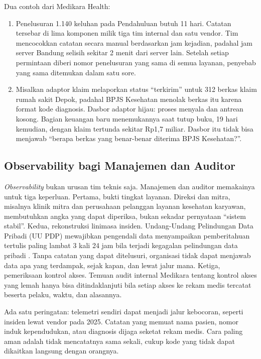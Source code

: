 Dua contoh dari Medikara Health:
\begin{enumerate}
  \item Penelusuran 1.140 keluhan pada Pendahuluan butuh 11 hari. Catatan tersebar di lima
        komponen milik tiga tim internal dan satu vendor. Tim mencocokkan catatan secara manual
        berdasarkan jam kejadian, padahal jam server Bandung selisih sekitar 2 menit dari server
        lain. Setelah setiap permintaan diberi nomor penelusuran yang sama di semua layanan,
        penyebab yang sama ditemukan dalam satu sore.
  \item Misalkan adaptor klaim melaporkan status ``terkirim'' untuk 312 berkas klaim rumah sakit
        Depok, padahal BPJS Kesehatan menolak berkas itu karena format kode diagnosis. Dasbor
        adaptor hijau: proses menyala dan antrean kosong. Bagian keuangan baru menemukannya saat
        tutup buku, 19 hari kemudian, dengan klaim tertunda sekitar Rp1,7 miliar. Dasbor itu tidak
        bisa menjawab ``berapa berkas yang benar-benar diterima BPJS Kesehatan?''.
\end{enumerate}

\subsection{Observability bagi Manajemen dan Auditor}

\textit{Observability} bukan urusan tim teknis saja. Manajemen dan auditor memakainya untuk tiga
keperluan. Pertama, bukti tingkat layanan. Direksi dan mitra, misalnya klinik mitra dan perusahaan
pelanggan layanan kesehatan karyawan, membutuhkan angka yang dapat diperiksa, bukan sekadar
pernyataan ``sistem stabil''. Kedua, rekonstruksi linimasa insiden. Undang-Undang Pelindungan Data
Pribadi (UU PDP) mewajibkan pengendali data menyampaikan pemberitahuan tertulis paling lambat 3 kali
24 jam bila terjadi kegagalan pelindungan data pribadi \cite{uu27-2022-pdp}. Tanpa catatan yang
dapat ditelusuri, organisasi tidak dapat menjawab data apa yang terdampak, sejak kapan, dan lewat
jalur mana. Ketiga, pemeriksaan kontrol akses. Temuan audit internal Medikara tentang kontrol akses
yang lemah hanya bisa ditindaklanjuti bila setiap akses ke rekam medis tercatat beserta pelaku,
waktu, dan alasannya.

Ada satu peringatan: telemetri sendiri dapat menjadi jalur kebocoran, seperti insiden lewat
vendor pada 2025. Catatan yang memuat nama pasien, nomor induk kependudukan, atau diagnosis
dijaga seketat rekam medis. Cara paling aman adalah tidak mencatatnya sama sekali, cukup kode yang
tidak dapat dikaitkan langsung dengan orangnya.

